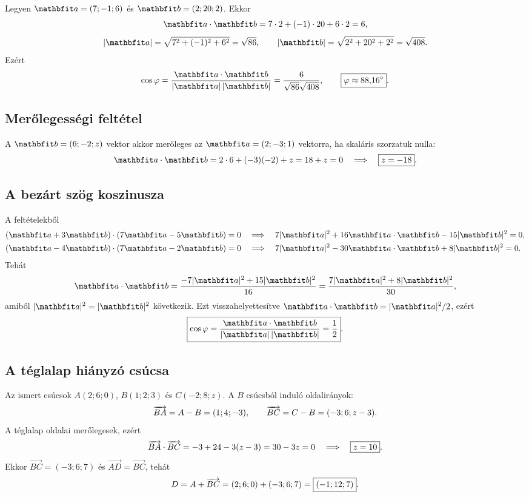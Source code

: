 \documentclass{szb-solution}
\begin{document}
Legyen $\rvec a=(7;-1;6)$ és $\rvec b=(2;20;2)$. Ekkor
$$
  \rvec a\cdot\rvec b=7\cdot2+(-1)\cdot20+6\cdot2=6,
$$
$$
  |\rvec a|=\sqrt{7^2+(-1)^2+6^2}=\sqrt{86},
  \qquad
  |\rvec b|=\sqrt{2^2+20^2+2^2}=\sqrt{408}
  \text.
$$
Ezért
$$
  \cos\varphi
  =\frac{\rvec a\cdot\rvec b}{|\rvec a|\,|\rvec b|}
  =\frac{6}{\sqrt{86}\sqrt{408}},
  \qquad
  \boxed{\varphi\approx88{,}16^\circ}
  \text.
$$

\subsection{Merőlegességi feltétel}

A $\rvec b=(6;-2;z)$ vektor akkor merőleges az
$\rvec a=(2;-3;1)$ vektorra, ha skaláris szorzatuk nulla:
$$
  \rvec a\cdot\rvec b
  =2\cdot6+(-3)(-2)+z
  =18+z=0
  \quad\Longrightarrow\quad
  \boxed{z=-18}
  \text.
$$

\subsection{A bezárt szög koszinusza}

A feltételekből
\begin{align*}
  (\rvec a+3\rvec b)\cdot(7\rvec a-5\rvec b)=0
  &\quad\Longrightarrow\quad
  7|\rvec a|^2+16\rvec a\cdot\rvec b-15|\rvec b|^2=0,
  \\
  (\rvec a-4\rvec b)\cdot(7\rvec a-2\rvec b)=0
  &\quad\Longrightarrow\quad
  7|\rvec a|^2-30\rvec a\cdot\rvec b+8|\rvec b|^2=0
  \text.
\end{align*}
Tehát
$$
  \rvec a\cdot\rvec b
  =\frac{-7|\rvec a|^2+15|\rvec b|^2}{16}
  =\frac{7|\rvec a|^2+8|\rvec b|^2}{30}
  \text,
$$
amiből $|\rvec a|^2=|\rvec b|^2$ következik. Ezt visszahelyettesítve
$\rvec a\cdot\rvec b=|\rvec a|^2/2$, ezért
$$
  \boxed{
    \cos\varphi
    =\frac{\rvec a\cdot\rvec b}{|\rvec a|\,|\rvec b|}
    =\frac12
  }
  \text.
$$

\subsection{A téglalap hiányzó csúcsa}

Az ismert csúcsok $A(2;6;0)$, $B(1;2;3)$ és $C(-2;8;z)$. A $B$ csúcsból
induló oldalirányok:
$$
  \overrightarrow{BA}=A-B=(1;4;-3),
  \qquad
  \overrightarrow{BC}=C-B=(-3;6;z-3)
  \text.
$$
A téglalap oldalai merőlegesek, ezért
$$
  \overrightarrow{BA}\cdot\overrightarrow{BC}
  =-3+24-3(z-3)=30-3z=0
  \quad\Longrightarrow\quad
  \boxed{z=10}
  \text.
$$
Ekkor $\overrightarrow{BC}=(-3;6;7)$ és
$\overrightarrow{AD}=\overrightarrow{BC}$, tehát
$$
  D=A+\overrightarrow{BC}
  =(2;6;0)+(-3;6;7)
  =\boxed{(-1;12;7)}
  \text.
$$
\end{document}
